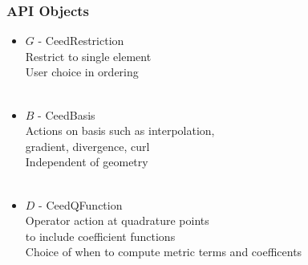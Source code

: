 \documentclass{beamer}
\begin{document}

\begin{frame}
\begin{center}
\frametitle{API Objects}

\begin{itemize}

\item $G$ - CeedRestriction\\

\hspace{6mm} Restrict to single element\\

\hspace{6mm} User choice in ordering\\

~\\

\item {\color{blue(ncs)} $B$} - CeedBasis\\

\hspace{6mm} Actions on basis such as interpolation,\\

\hspace{10mm} gradient, divergence, curl\\

\hspace{6mm} Independent of geometry\\

~\\

\item {\color{applegreen} $D$} - CeedQFunction\\

\hspace{6mm} Operator action at quadrature points\\

\hspace{10mm} to include coefficient functions\\

\hspace{6mm} Choice of when to compute metric terms and coefficents

\end{itemize}

\end{center}
\end{frame}

\end{document}
